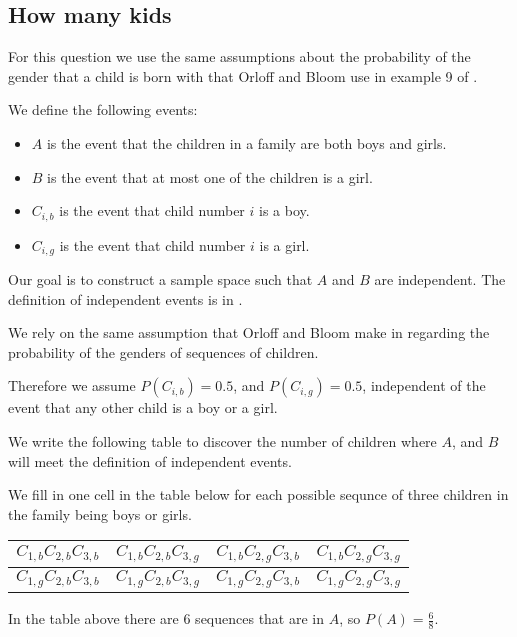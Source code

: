 \documentclass[a4paper,11pt]{article}
\begin{document}
\subsection{How many kids}
For this question we use the same assumptions about the probability of the
gender that a child is born with that Orloff and Bloom use in example 9 of
\cite{reading4a}.

We define the following events:

\begin{itemize}
\item $A$ is the event that the children in a family are both boys and girls.
\item $B$ is the event that at most one of the children is a girl.
\item $C_{i,b}$ is the event that child number $i$ is a boy.
\item $C_{i,g}$ is the event that child number $i$ is a girl.
\end{itemize}

Our goal is to construct a sample space such that $A$ and $B$ are independent.
The definition of independent events is in \cite{reading3}.

We rely on the same assumption that Orloff and Bloom make in \cite{reading4a}
regarding the probability of the genders of sequences of children.

Therefore we assume  $P\left( C_{i,b} \right) = 0.5$, and $P\left( C_{i,g} \right) = 0.5$,
independent of the event that any other child is a boy or a girl.

We write the following table to discover the number of children where
$A$, and $B$ will meet the definition of independent events.

We fill in one cell in the table below for each possible
sequnce of three children in the family being boys
or girls.

\begin{center}
  \begin{tabular}{ | c | c | c | c | }
    \hline
	$C_{1,b}C_{2,b}C_{3,b}$ & $C_{1,b}C_{2,b}C_{3,g}$ & $C_{1,b}C_{2,g}C_{3,b}$ & $C_{1,b}C_{2,g}C_{3,g}$   \\ \hline
  $C_{1,g}C_{2,b}C_{3,b}$ & $C_{1,g}C_{2,b}C_{3,g}$ & $C_{1,g}C_{2,g}C_{3,b}$ & $C_{1,g}C_{2,g}C_{3,g}$   \\ \hline
  \end{tabular}
\end{center}

In the table above there are $6$ sequences that are in $A$, so $P\left( A \right) = \frac{6}{8}$.
\end{document}
